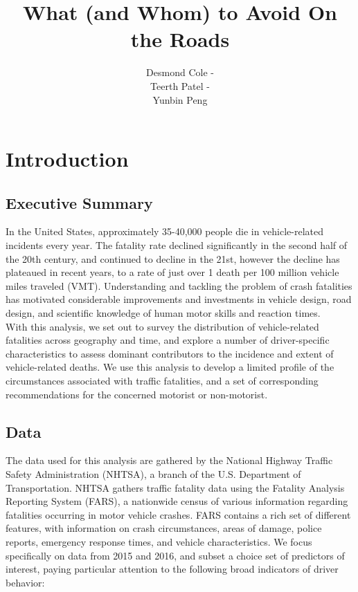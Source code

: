 \documentclass[11pt, oneside,titlepage]{article}   	%
\title{What (and Whom) to Avoid On the Roads}
\author{Desmond Cole - \\
Teerth Patel - \\ 
Yunbin Peng}
\begin{document}
\maketitle
\section*{Introduction}
\subsection*{Executive Summary}
In the United States, approximately 35-40,000 people die in vehicle-related incidents every year. The fatality rate declined significantly in the second half of the 20th century, and continued to decline in the 21st, however the decline has plateaued in recent years, to a rate of just over 1 death per 100 million vehicle miles traveled (VMT). Understanding and tackling the problem of crash fatalities has motivated considerable improvements and investments in vehicle design, road design, and scientific knowledge of human motor skills and reaction times. \\ 

With this analysis, we set out to survey the distribution of vehicle-related fatalities across geography and time, and explore a number of driver-specific characteristics to assess dominant contributors to the incidence and extent of vehicle-related deaths. We use this analysis to develop a limited profile of the circumstances associated with traffic fatalities, and a set of corresponding recommendations for the concerned motorist or non-motorist.

\subsection*{Data}
The data used for this analysis are gathered by the National Highway Traffic Safety Administration (NHTSA), a branch of the U.S. Department of Transportation. NHTSA gathers traffic fatality data using the Fatality Analysis Reporting System (FARS), a nationwide census of various information regarding fatalities occurring in motor vehicle crashes. FARS contains a rich set of different features, with information on crash circumstances, areas of damage, police reports, emergency response times, and vehicle characteristics. We focus specifically on data from 2015 and 2016, and subset a choice set of predictors of interest, paying particular attention to the following broad indicators of driver behavior:
\end{document}

